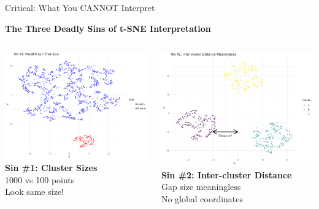 \documentclass[aspectratio=169]{beamer}
\begin{document}
\begin{frame}{Critical: What You CANNOT Interpret}
\begin{center}
\colorbox{red!30}{\Large\textbf{The Three Deadly Sins of t-SNE Interpretation}}
\end{center}

\begin{columns}
\includegraphics[width=\textwidth]{./Figures/sin1_cluster_size.png}
\textbf{Sin \#1: Cluster Sizes}\\
  1000 vs 100 points\\
  Look same size!
    
  \includegraphics[width=\textwidth]{./Figures/sin2_distances.png}
  \textbf{Sin \#2: Inter-cluster Distance}\\
    Gap size meaningless\\
    No global coordinates
    

\end{columns}
\end{frame}
\end{document}
